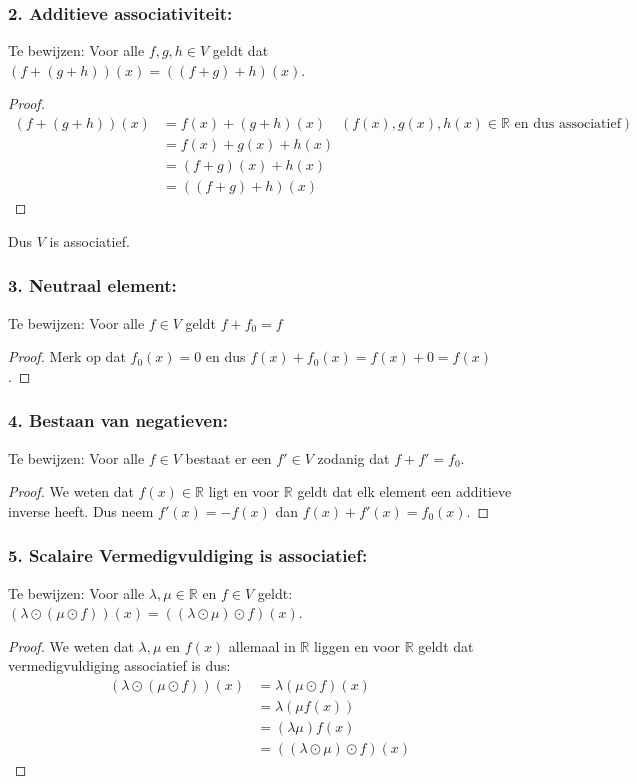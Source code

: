 \documentclass{article}
\newcommand{\R}{\mathbb{R}}
\begin{document}
\subsubsection*{2. Additieve associativiteit:}
Te bewijzen: Voor alle $f, g, h \in V$ geldt dat $(f+(g+h))(x) = ((f + g) + h)(x)$.
\begin{proof}
    \begin{align*}
        (f + (g + h))(x) & = f(x) + (g + h)(x)  \quad (f(x), g(x), h(x) \in \R \text{ en dus associatief}) \\
                         & = f(x) + g(x) + h(x)                                                            \\
                         & = (f + g)(x) + h(x)                                                             \\
                         & = ((f + g)+h)(x)
    \end{align*}
\end{proof}
Dus $V$ is associatief.
\subsubsection*{3. Neutraal element:}
Te bewijzen: Voor alle $f \in V$ geldt $f + f_0 = f$
\begin{proof}
    Merk op dat $f_0(x) = 0$ en dus $f(x) + f_0(x) = f(x) + 0 = f(x)$.
\end{proof}
\subsubsection*{4. Bestaan van negatieven:}
Te bewijzen: Voor alle $f \in V$ bestaat er een $f' \in V$ zodanig dat $f + f' = f_0$.
\begin{proof}
    We weten dat $f(x) \in \R$ ligt en voor $\R$ geldt dat elk element een additieve inverse heeft.
    Dus neem $f'(x) = -f(x)$ dan $f(x) + f'(x) = f_0(x)$.
\end{proof}
\subsubsection*{5. Scalaire Vermedigvuldiging is associatief:}
Te bewijzen: Voor alle $\lambda, \mu \in \R$ en $f \in V$ geldt: $(\lambda \odot (\mu \odot f))(x) = ((\lambda \odot \mu) \odot f)(x)$.
\begin{proof}
    We weten dat $\lambda, \mu$ en $f(x)$ allemaal in $\R$ liggen en voor
    $\R$ geldt dat vermedigvuldiging associatief is dus:
    \begin{align*}
        (\lambda \odot (\mu \odot f))(x) & =  \lambda (\mu \odot f)(x)        \\
                                         & = \lambda(\mu f(x))                \\
                                         & = (\lambda \mu)f(x)                \\
                                         & = ((\lambda \odot \mu) \odot f)(x)
    \end{align*}
\end{proof}
\end{document}
